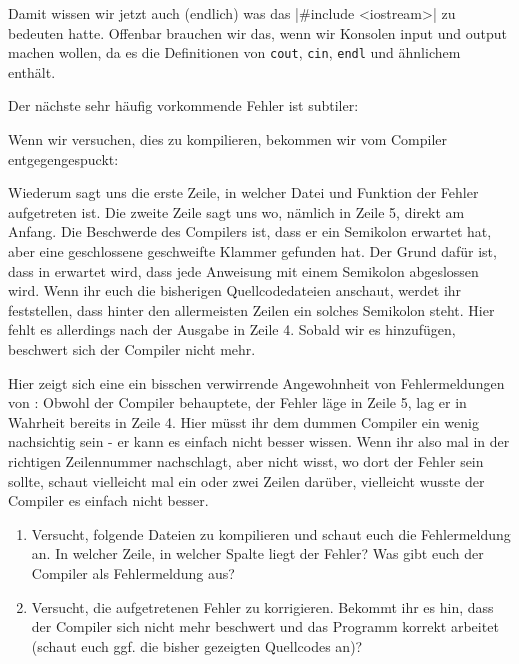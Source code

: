 Damit wissen wir jetzt auch (endlich) was das |#include <iostream>|
zu bedeuten hatte. Offenbar brauchen wir das, wenn wir Konsolen input und
output machen wollen, da es die Definitionen von \texttt{cout}, \texttt{cin},
\texttt{endl} und ähnlichem enthält.

Der nächste sehr häufig vorkommende Fehler ist subtiler:


Wenn wir versuchen, dies zu kompilieren, bekommen wir vom Compiler
entgegengespuckt:

\begin{textcode*}{label=g++ -o fehler2 fehler2.cpp}
    fehler2.cpp: In function 'int main()':
    fehler2.cpp:5:1: error: expected ';' before '}' token
\end{textcode*}

Wiederum sagt uns die erste Zeile, in welcher Datei und Funktion der Fehler
aufgetreten ist. Die zweite Zeile sagt uns wo, nämlich in Zeile 5, direkt am
Anfang. Die Beschwerde des Compilers ist, dass er ein Semikolon erwartet hat,
aber eine geschlossene geschweifte Klammer gefunden hat. Der Grund dafür ist,
dass in \Cpp erwartet wird, dass jede Anweisung mit einem Semikolon abgeslossen
wird.  Wenn ihr euch die bisherigen Quellcodedateien anschaut, werdet ihr
feststellen, dass hinter den allermeisten Zeilen ein solches Semikolon steht.
Hier fehlt es allerdings nach der Ausgabe in Zeile 4. Sobald wir es hinzufügen,
beschwert sich der Compiler nicht mehr.

Hier zeigt sich eine ein bisschen verwirrende Angewohnheit von Fehlermeldungen
von \Cpp: Obwohl der Compiler behauptete, der Fehler läge in Zeile 5, lag er in
Wahrheit bereits in Zeile 4. Hier müsst ihr dem dummen Compiler ein wenig
nachsichtig sein - er kann es einfach nicht besser wissen. Wenn ihr also mal in
der richtigen Zeilennummer nachschlagt, aber nicht wisst, wo dort der Fehler
sein sollte, schaut vielleicht mal ein oder zwei Zeilen darüber, vielleicht
wusste der Compiler es einfach nicht besser.

\begin{praxis}
    \begin{enumerate}
        \item Versucht, folgende Dateien zu kompilieren und schaut euch die
              Fehlermeldung an. In welcher Zeile, in welcher Spalte liegt der Fehler?
              Was gibt euch der Compiler als Fehlermeldung aus?
        \item Versucht, die aufgetretenen Fehler zu korrigieren. Bekommt ihr es
              hin, dass der Compiler sich nicht mehr beschwert und das Programm
              korrekt arbeitet (schaut euch ggf. die bisher gezeigten Quellcodes an)?
    \end{enumerate}


\end{praxis}

